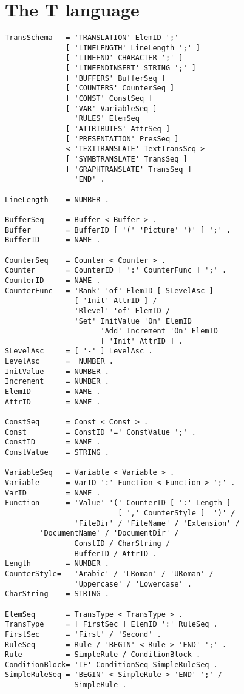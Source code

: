 \section{The T language}

\begin{verbatim}
TransSchema   = 'TRANSLATION' ElemID ';'
              [ 'LINELENGTH' LineLength ';' ]
              [ 'LINEEND' CHARACTER ';' ]
              [ 'LINEENDINSERT' STRING ';' ]
              [ 'BUFFERS' BufferSeq ]
              [ 'COUNTERS' CounterSeq ]
              [ 'CONST' ConstSeq ]
              [ 'VAR' VariableSeq ]
                'RULES' ElemSeq
              [ 'ATTRIBUTES' AttrSeq ]
              [ 'PRESENTATION' PresSeq ]
              < 'TEXTTRANSLATE' TextTransSeq >
              [ 'SYMBTRANSLATE' TransSeq ]
              [ 'GRAPHTRANSLATE' TransSeq ]
                'END' .

LineLength    = NUMBER .

BufferSeq     = Buffer < Buffer > .
Buffer        = BufferID [ '(' 'Picture' ')' ] ';' .
BufferID      = NAME .

CounterSeq    = Counter < Counter > .
Counter       = CounterID [ ':' CounterFunc ] ';' .
CounterID     = NAME .
CounterFunc   = 'Rank' 'of' ElemID [ SLevelAsc ]
                [ 'Init' AttrID ] /
                'Rlevel' 'of' ElemID /
                'Set' InitValue 'On' ElemID
                      'Add' Increment 'On' ElemID
                      [ 'Init' AttrID ] .
SLevelAsc     = [ '-' ] LevelAsc .
LevelAsc      =  NUMBER .
InitValue     = NUMBER .
Increment     = NUMBER .
ElemID        = NAME .
AttrID        = NAME .

ConstSeq      = Const < Const > .
Const         = ConstID '=' ConstValue ';' .
ConstID       = NAME .
ConstValue    = STRING .

VariableSeq   = Variable < Variable > .
Variable      = VarID ':' Function < Function > ';' .
VarID         = NAME .
Function      = 'Value' '(' CounterID [ ':' Length ]
                          [ ',' CounterStyle ]  ')' /
                'FileDir' / 'FileName' / 'Extension' /
		'DocumentName' / 'DocumentDir' /
                ConstID / CharString / 
                BufferID / AttrID .
Length        = NUMBER .
CounterStyle=   'Arabic' / 'LRoman' / 'URoman' /
                'Uppercase' / 'Lowercase' .
CharString    = STRING .

ElemSeq       = TransType < TransType > .
TransType     = [ FirstSec ] ElemID ':' RuleSeq .
FirstSec      = 'First' / 'Second' .
RuleSeq       = Rule / 'BEGIN' < Rule > 'END' ';' .
Rule          = SimpleRule / ConditionBlock .
ConditionBlock= 'IF' ConditionSeq SimpleRuleSeq .
SimpleRuleSeq = 'BEGIN' < SimpleRule > 'END' ';' / 
                SimpleRule .


\end{verbatim}
